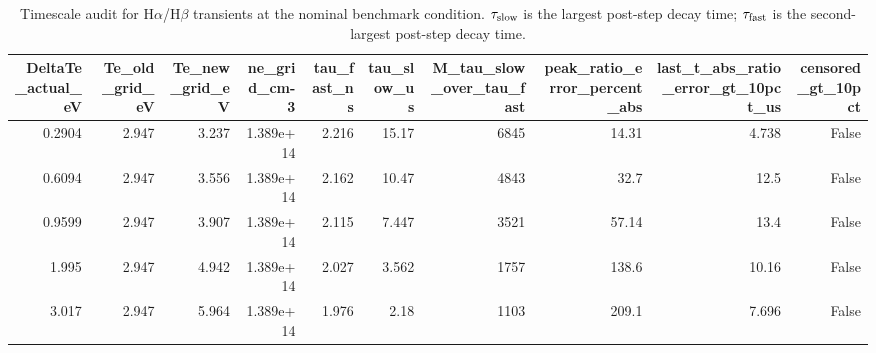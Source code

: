 \begin{table}
\caption{Timescale audit for H$\alpha$/H$\beta$ transients at the nominal benchmark condition. $\tau_{\rm slow}$ is the largest post-step decay time; $\tau_{\rm fast}$ is the second-largest post-step decay time.}
\label{tab:balmer_timescale_audit_benchmark}
\begin{tabular}{rrrrrrrrrr}
\toprule
DeltaTe_actual_eV & Te_old_grid_eV & Te_new_grid_eV & ne_grid_cm-3 & tau_fast_ns & tau_slow_us & M_tau_slow_over_tau_fast & peak_ratio_error_percent_abs & last_t_abs_ratio_error_gt_10pct_us & censored_gt_10pct \\
\midrule
0.2904 & 2.947 & 3.237 & 1.389e+14 & 2.216 & 15.17 & 6845 & 14.31 & 4.738 & False \\
0.6094 & 2.947 & 3.556 & 1.389e+14 & 2.162 & 10.47 & 4843 & 32.7 & 12.5 & False \\
0.9599 & 2.947 & 3.907 & 1.389e+14 & 2.115 & 7.447 & 3521 & 57.14 & 13.4 & False \\
1.995 & 2.947 & 4.942 & 1.389e+14 & 2.027 & 3.562 & 1757 & 138.6 & 10.16 & False \\
3.017 & 2.947 & 5.964 & 1.389e+14 & 1.976 & 2.18 & 1103 & 209.1 & 7.696 & False \\
\bottomrule
\end{tabular}
\end{table}
